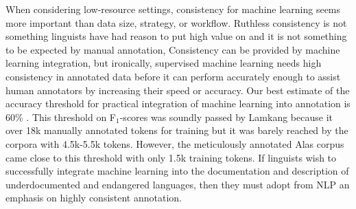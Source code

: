 When considering low-resource settings, consistency for machine learning seems more important than data size, strategy, or workflow. Ruthless consistency is not something linguists have had reason to put high value on and it is not something to be expected by manual annotation, %
Consistency can be provided by machine learning integration, but ironically, supervised machine learning needs high consistency in annotated data before it can perform accurately enough to assist human annotators by increasing their speed or accuracy. Our best estimate of the accuracy threshold for practical integration of machine learning into annotation is 60\% \citep{felt_improving_2012}. This threshold on F$_1$-scores was soundly passed by Lamkang because it over 18k manually annotated tokens for training but it was barely reached by the corpora with 4.5k-5.5k tokens. However, the meticulously annotated Alas corpus came close to this threshold with only 1.5k training tokens. If linguists wish to successfully integrate machine learning into the documentation and description of underdocumented and endangered languages, then they must adopt from NLP an emphasis on highly consistent annotation.



